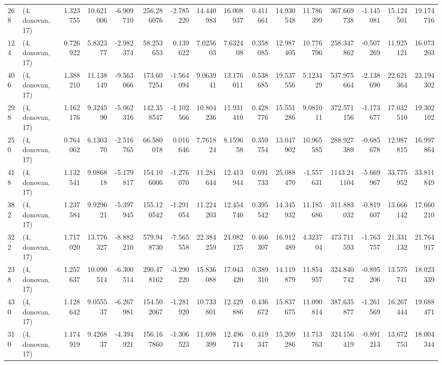 \begin{tabular}{llrrrrrrrrrrrrrr}
268 &  (4, donovan, 17) &   1.323755 &  10.621006 &  -6.909710 &   256.286076 &  -2.785220 &  14.440983 &  16.008937 &  0.411661 &  14.930548 &  11.786399 &   367.669738 & -1.145081 &  15.124501 &  19.174716 \\
124 &  (4, donovan, 17) &   0.726922 &   5.832377 &  -2.982374 &    58.253653 &   0.139622 &   7.025603 &   7.632408 &  0.358085 &  12.987405 &  10.776796 &   258.347862 & -0.507269 &  11.925121 &  16.073203 \\
406 &  (4, donovan, 17) &   1.388210 &  11.138149 &  -9.563066 &   173.607254 &  -1.564094 &   9.063941 &  13.176011 &  0.538685 &  19.537556 &   5.123429 &   537.975664 & -2.138690 &  22.621364 &  23.194302 \\
298 &  (4, donovan, 17) &   1.162176 &   9.324590 &  -5.062316 &   142.358547 &  -1.102566 &  10.804236 &  11.931410 &  0.428776 &  15.551286 &   9.081011 &   372.571156 & -1.173677 &  17.032510 &  19.302102 \\
250 &  (4, donovan, 17) &   0.764062 &   6.130370 &  -2.516765 &    66.580018 &   0.016646 &   7.761824 &   8.159658 &  0.359754 &  13.047902 &  10.965585 &   288.927389 & -0.685678 &  12.987815 &  16.997864 \\
418 &  (4, donovan, 17) &   1.132541 &   9.086818 &  -5.179817 &   154.106006 &  -1.276070 &  11.281644 &  12.413944 &  0.691733 &  25.088470 &  -1.557631 &  1143.241104 & -5.669967 &  33.775952 &  33.811849 \\
382 &  (4, donovan, 17) &   1.237584 &   9.929621 &  -5.397945 &   155.120542 &  -1.291054 &  11.224203 &  12.454740 &  0.395542 &  14.345932 &  11.185686 &   311.883032 & -0.819607 &  13.666142 &  17.660210 \\
322 &  (4, donovan, 17) &   1.717020 &  13.776327 &  -8.882210 &   579.948730 &  -7.565558 &  22.384259 &  24.082125 &  0.466307 &  16.912489 &   4.323704 &   473.711593 & -1.763757 &  21.331132 &  21.764917 \\
238 &  (4, donovan, 17) &   1.257637 &  10.090514 &  -6.300514 &   290.478162 &  -3.290220 &  15.836088 &  17.043420 &  0.389310 &  14.119879 &  11.854957 &   324.840742 & -0.895206 &  13.575741 &  18.023339 \\
430 &  (4, donovan, 17) &   1.128642 &   9.055537 &  -6.267981 &   154.502067 &  -1.281920 &  10.733801 &  12.429886 &  0.436672 &  15.837675 &  11.090814 &   387.635877 & -1.261569 &  16.267444 &  19.688471 \\
310 &  (4, donovan, 17) &   1.174919 &   9.426837 &  -4.394921 &   156.167860 &  -1.306523 &  11.698399 &  12.496714 &  0.419347 &  15.209286 &  11.713763 &   324.156419 & -0.891213 &  13.672753 &  18.004344 \\

\end{tabular}
